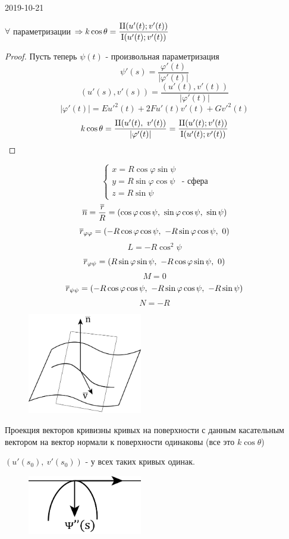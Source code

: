 \documentclass[main]{subfiles}
\begin{document}
\begin{lect} {2019-10-21}
		\begin{theorem}
			$\forall$ параметризации $\Ra k \cos \theta = \dfrac{\RNumb{2} (u'(t); v'(t))}{\RNumb{1} (u'(t); v'(t))}$
		\end{theorem}
		\begin{proof}
			Пусть теперь $\psi(t)$ - произвольная параметризация
			\[\psi'(s) = \dfrac{\varphi'(t)}{|\varphi'(t)|}\]
			\[(u'(s), v'(s)) = \dfrac{(u'(t), v'(t))}{|\varphi'(t)|}\]
			\[|\varphi'(t)| = E u'^2(t) + 2F u'(t) v'(t) + G v'^2(t)\]
			\[k \cos \theta = \dfrac{\RNumb{2} (u'(t),\ v'(t))}{|\varphi'(t)|} = \dfrac{\RNumb{2} (u'(t); v'(t))}{\RNumb{1} (u'(t); v'(t))}\]
		\end{proof}

		\begin{Example}
			\[\begin{cases}
				x = R \cos \varphi \sin \psi\\
				y = R \sin \varphi \cos \psi\\
				z = R \sin \psi
			\end{cases} \text{ - сфера}\]
			\[\overline{n} = \dfrac{\overline{r}}{R} = (\cos \varphi \cos \psi,\ \sin \varphi \cos \psi,\ \sin \psi)\]
			\[\overline{r}_{\varphi \varphi} = (-R \cos \varphi \cos \psi,\ -R \sin \varphi \cos \psi,\ 0)\]
			\[L = -R \cos^2 \psi\]
			\[\overline{r}_{\varphi \psi} = (R \sin \varphi \sin \psi,\ -R \cos \varphi \sin \psi,\ 0)\]
			\[M = 0\]
			\[\overline{r}_{\psi \psi} = (-R \cos \varphi \cos \psi,\ -R \sin \varphi \cos \psi,\ -R \sin \psi)\]
			\[N = -R\]
		\end{Example}

		\begin{figure}[H]
			\centering
			\includegraphics[width=5cm]{pics/7_7.png}
		\end{figure}
		\begin{theorem}
			Проекция векторов кривизны кривых на поверхности с данным касательным вектором на вектор нормали к поверхности одинаковы (все это $k \cos \theta$)
		\end{theorem}
		$(u'(s_0),\ v'(s_0)) \text{ - у всех таких кривых одинак.}$
		\begin{figure}[H]
			\centering
			\includegraphics[width=5cm]{pics/7_8.png}
		\end{figure}


\end{lect}
\end{document}
